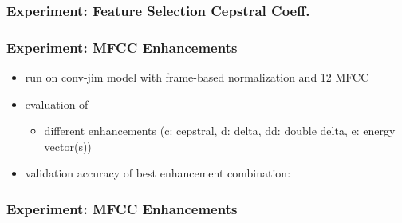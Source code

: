 \begin{frame}
  \frametitle{Experiment: Feature Selection Cepstral Coeff.}
  
\end{frame}

\begin{frame}
  \frametitle{Experiment: MFCC Enhancements}
  \begin{itemize}
    \item run on conv-jim model with frame-based normalization and 12 MFCC
    \item evaluation of
    \begin{itemize}
     \item different enhancements (c: cepstral, d: delta, dd: double delta, e: energy vector(s))
    \end{itemize}
    \item validation accuracy of best enhancement combination:
  \end{itemize}
  \vspace{-0.5cm}
  \begin{figure}[!ht]
    \centering
  \end{figure}
\end{frame}

\begin{frame}
  \frametitle{Experiment: MFCC Enhancements}
  
\end{frame}

